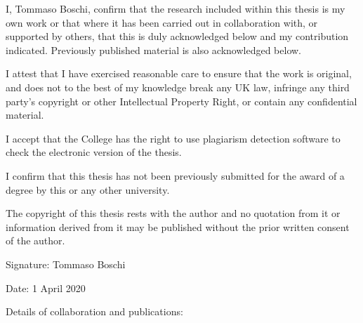 \clearpage

I, Tommaso Boschi, confirm that the research included within this thesis %
is my own work or that where it has been carried out in collaboration with, %
or supported by others, that this is duly acknowledged below and my contribution indicated.
Previously published material is also acknowledged below.

\medskip
\noindent
I attest that I have exercised reasonable care to ensure that the work is original, %
and does not to the best of my knowledge break any UK law, infringe any third party’s copyright %
or other Intellectual Property Right, or contain any confidential material.

\medskip
\noindent
I accept that the College has the right to use plagiarism detection %
software to check the electronic version of the thesis.

\medskip
\noindent
I confirm that this thesis has not been previously submitted %
for the award of a degree by this or any other university.

\medskip
\noindent
The copyright of this thesis rests with the author and no quotation from it %
or information derived from it may be published without the prior written consent of the author.

\medskip
Signature: Tommaso Boschi

Date:	1 April 2020

\bigskip
Details of collaboration and publications:

